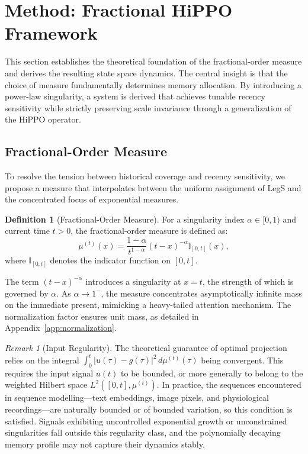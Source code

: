 \documentclass{article}
\theoremstyle{plain}
\theoremstyle{definition}
\newtheorem{definition}[theorem]{Definition}
\theoremstyle{remark}
\newtheorem{remark}[theorem]{Remark}
\begin{document}
\section{Method: Fractional HiPPO Framework}
\label{sec:method}

This section establishes the theoretical foundation of the fractional-order measure and derives the resulting state space dynamics. The central insight is that the choice of measure fundamentally determines memory allocation. By introducing a power-law singularity, a system is derived that achieves tunable recency sensitivity while strictly preserving scale invariance through a generalization of the HiPPO operator.

\subsection{Fractional-Order Measure}
\label{subsec:fractional_measure}

To resolve the tension between historical coverage and recency sensitivity, we propose a measure that interpolates between the uniform assignment of LegS and the concentrated focus of exponential measures. 

\begin{definition}[Fractional-Order Measure]
	\label{def:fractional_measure}
	For a singularity index $\alpha \in [0, 1)$ and current time $t > 0$, the fractional-order measure is defined as:
	\begin{equation}
		\mu^{(t)}(x) = \frac{1-\alpha}{t^{1-\alpha}} (t - x)^{-\alpha} \mathbb{I}_{[0, t]}(x),
		\label{eq:fractional_measure}
	\end{equation}
	where $\mathbb{I}_{[0,t]}$ denotes the indicator function on $[0, t]$.
\end{definition}

The term $(t-x)^{-\alpha}$ introduces a singularity at $x=t$, the strength of which is governed by $\alpha$. As $\alpha \to 1^-$, the measure concentrates asymptotically infinite mass on the immediate present, mimicking a heavy-tailed attention mechanism. The normalization factor ensures unit mass, as detailed in Appendix~\ref{app:normalization}.

\begin{remark}[Input Regularity]
	\label{rem:input_regularity}
	The theoretical guarantee of optimal projection relies on the integral $\int_0^t |u(\tau) - g(\tau)|^2 \, d\mu^{(t)}(\tau)$ being convergent. This requires the input signal $u(t)$ to be bounded, or more generally to belong to the weighted Hilbert	space $L^2([0,t],\mu^{(t)})$. In practice, the sequences encountered in sequence modelling—text embeddings, image pixels, and physiological recordings—are naturally bounded or of bounded variation, so this condition is satisfied. Signals exhibiting uncontrolled exponential growth or unconstrained singularities fall outside this regularity class, and the polynomially decaying memory profile may not capture their dynamics stably.
\end{remark}
\end{document}

